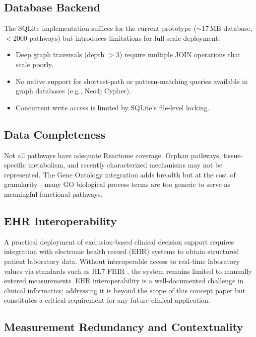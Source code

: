 \documentclass[12pt,a4paper]{article}
\begin{document}
\subsection{Database Backend}

The SQLite implementation suffices for the current prototype ($\sim$17\,MB database, $<$2000 pathways) but introduces limitations for full-scale deployment:

\begin{itemize}
    \item Deep graph traversals (depth $>3$) require multiple JOIN operations that scale poorly.
    \item No native support for shortest-path or pattern-matching queries available in graph databases (e.g., Neo4j Cypher).
    \item Concurrent write access is limited by SQLite's file-level locking.
\end{itemize}

\subsection{Data Completeness}

Not all pathways have adequate Reactome coverage. Orphan pathways, tissue-specific metabolism, and recently characterized mechanisms may not be represented. The Gene Ontology integration adds breadth but at the cost of granularity---many GO biological process terms are too generic to serve as meaningful functional pathways.

\subsection{EHR Interoperability}

A practical deployment of exclusion-based clinical decision support requires integration with electronic health record (EHR) systems to obtain structured patient laboratory data. Without interoperable access to real-time laboratory values via standards such as HL7 FHIR \citep{HL7FHIR2023}, the system remains limited to manually entered measurements. EHR interoperability is a well-documented challenge in clinical informatics; addressing it is beyond the scope of this concept paper but constitutes a critical requirement for any future clinical application.

\subsection{Measurement Redundancy and Contextuality}
\end{document}
